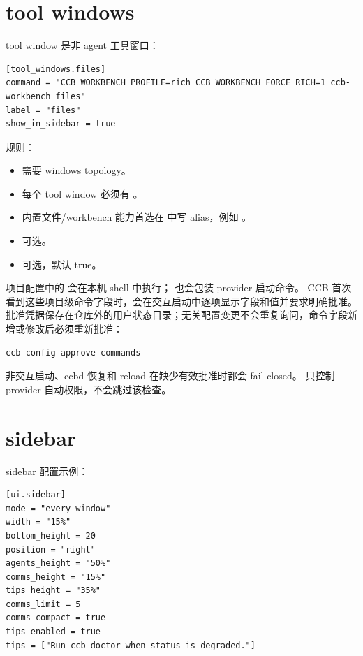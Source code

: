 \section{tool windows}

tool window 是非 agent 工具窗口：

\begin{lstlisting}
[tool_windows.files]
command = "CCB_WORKBENCH_PROFILE=rich CCB_WORKBENCH_FORCE_RICH=1 ccb-workbench files"
label = "files"
show_in_sidebar = true
\end{lstlisting}

规则：

\begin{itemize}
  \item {} 需要 windows topology。
  \item 每个 tool window 必须有 。
  \item 内置文件/workbench 能力首选在  中写  alias，例如 。
  \item {} 可选。
  \item {} 可选，默认 true。
\end{itemize}

项目配置中的  会在本机 shell 中执行；
 也会包装 provider 启动命令。
CCB 首次看到这些项目级命令字段时，会在交互启动中逐项显示字段和值并要求明确批准。
批准凭据保存在仓库外的用户状态目录；无关配置变更不会重复询问，命令字段新增或修改后必须重新批准：

\begin{lstlisting}
ccb config approve-commands
\end{lstlisting}

非交互启动、ccbd 恢复和 reload 在缺少有效批准时都会 fail closed。
 只控制 provider 自动权限，不会跳过该检查。

\section{sidebar}

sidebar 配置示例：

\begin{lstlisting}
[ui.sidebar]
mode = "every_window"
width = "15%"
bottom_height = 20
position = "right"
agents_height = "50%"
comms_height = "15%"
tips_height = "35%"
comms_limit = 5
comms_compact = true
tips_enabled = true
tips = ["Run ccb doctor when status is degraded."]
\end{lstlisting}

